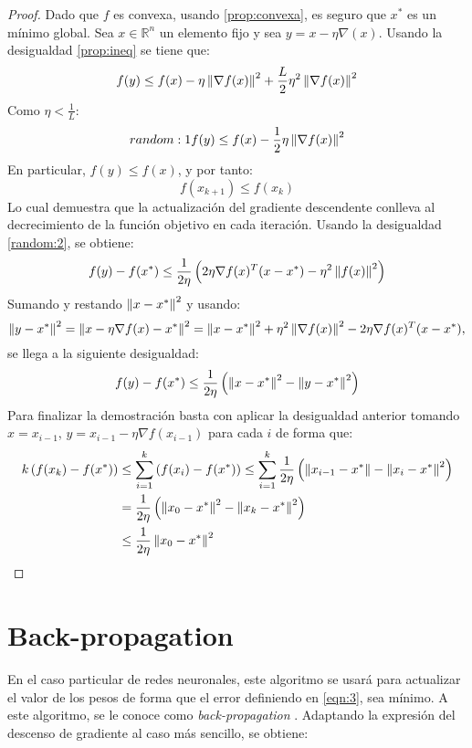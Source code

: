 \begin{proof}
    Dado que $f$ es convexa, usando \ref*{prop:convexa}, es seguro que $x^*$ es un mínimo global. Sea $x\in\mathbb{R}^n$ un elemento fijo y sea
    $y=x-\eta\nabla (x)$. Usando la desigualdad \ref*{prop:ineq} se tiene que:
    \[
        f(y) \leq f(x) - \eta\left\lVert\nabla f(x)\right\rVert^2 + \frac{L}{2}\eta^2\left\lVert\nabla f(x)\right\rVert^2
    \]
    Como $\eta<\frac{1}{L}$:
    \begin{equation}{random:1}
        f(y) \leq f(x) - \frac{1}{2}\eta \left\lVert\nabla f(x)\right\rVert^2
    \end{equation}
    En particular, $f(y)\leq f(x)$, y por tanto:
    \[
        f(x_{k+1}) \leq f(x_k)
    \]
    Lo cual demuestra que la actualización del gradiente descendente conlleva al decrecimiento de la función objetivo en cada iteración. Usando la desigualdad
    \ref*{random:2}, se obtiene:
    \[
        f(y) - f(x^*) \leq \frac{1}{2\eta}\left( 2\eta \nabla f(x)^T(x-x^*) - \eta^2\left\lVert f(x)\right\rVert^2 \right)
    \]
    Sumando y restando $\left\lVert x-x^*\right\rVert^2$ y usando:
    \[
        \left\lVert y-x^*\right\rVert^2 = \left\lVert x-\eta \nabla f(x)-x^*\right\rVert^2 = \left\lVert x-x^*\right\rVert^2 + \eta^2\left\lVert\nabla f(x)\right\rVert^2 - 2\eta \nabla f(x)^T(x-x^*),
    \]
    se llega a la siguiente desigualdad:
    \[
        f(y) - f(x^*) \leq \frac{1}{2\eta} \left( \left\lVert x-x^*\right\rVert^2 - \left\lVert y-x^*\right\rVert^2 \right)
    \]
    Para finalizar la demostración basta con aplicar la desigualdad anterior tomando $x=x_{i-1}$, $y=x_{i-1}-\eta\nabla f(x_{i-1})$ para cada
    $i$ de forma que:
    \begin{align*}
        k\left( f(x_k) - f(x^*) \right) & \leq \displaystyle \sum_{i=1}^k \left( f(x_i) - f(x^*) \right) \leq \displaystyle \sum_{i=1}^k \frac{1}{2\eta}\left( \left\lVert x_{i-1}-x^*\right\rVert - \left\lVert x_i - x^*\right\rVert^2 \right) \\
              & = \frac{1}{2\eta} \left( \left\lVert x_0 - x^*\right\rVert^2 - \left\lVert x_k-x^*\right\rVert^2 \right) \\
              & \leq \frac{1}{2\eta} \left\lVert x_0-x^*\right\rVert^2
    \end{align*}
\end{proof}

\section{Back-propagation}

En el caso particular de redes neuronales, este algoritmo se usará para actualizar el valor de los pesos
de forma que el error definiendo en \ref{eqn:3}, sea mínimo. A este algoritmo, se le conoce como
\textit{back-propagation} \cite{rumelhart1986learning}. Adaptando la expresión del descenso de gradiente al caso más sencillo, se obtiene:


